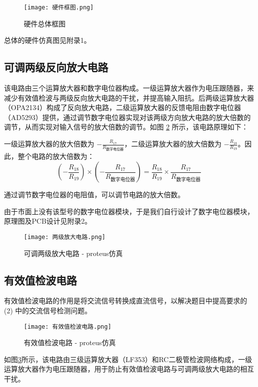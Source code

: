 \documentclass[lang=cn,11pt,a4paper]{elegantpaper}
\begin{document}
\begin{figure}[!htb]
  \centering
  \texttt{[image: 硬件框图.png]}
  \caption{硬件总体框图}
  \label{fig:hardware_picture}
\end{figure}
总体的硬件仿真图见附录1。

\subsection{可调两级反向放大电路}
该电路由三个运算放大器和数字电位器构成。一级运算放大器作为电压跟随器，来减少有效值检波与两级反向放大电路的干扰，并提高输入阻抗。后两级运算放大器（OPA2134）构成了反向放大电路，二级运算放大器的反馈电阻由数字电位器（AD5293）提供，通过调节数字电位器实现对该两级方向放大电路的放大倍数的调节，从而实现对输入信号的放大倍数的调节。如图 \ref{fig:two_stage_amplifier} 所示，该电路原理如下：

一级运算放大器的放大倍数为 \( -\frac{R_{17}}{R_{\text{数字电位器}}} \)，二级运算放大器的放大倍数为 \( -\frac{R_{18}}{R_{19}} \)。因此，整个电路的放大倍数为：
\[
  \left( -\frac{R_{18}}{R_{19}} \right) \times \left( -\frac{R_{17}}{R_{\text{数字电位器}}} \right) = \frac{R_{18}}{R_{19}} \times \frac{R_{17}}{R_{\text{数字电位器}}}
\]

通过调节数字电位器的电阻值，可以调节电路的放大倍数。

由于市面上没有该型号的数字电位器模块，于是我们自行设计了数字电位器模块，原理图及PCB设计见附录2。
\begin{figure}[!htb]
  \centering
  \texttt{[image: 两级放大电路.png]}
  \caption{可调两级放大电路 - proteus仿真}
  \label{fig:two_stage_amplifier}
\end{figure}

\subsection{有效值检波电路}
有效值检波电路的作用是将交流信号转换成直流信号，以解决题目中提高要求的 (2) 中的交流信号检测问题。

\begin{figure}[!htb]
  \centering
  \texttt{[image: 有效值检波电路.png]}
  \caption{有效值检波电路 - proteus仿真}
  \label{fig:effective_value_detection}
\end{figure}

如图\ref{fig:effective_value_detection}所示，该电路由三级运算放大器（LF353）和RC二极管检波网络构成，一级运算放大器作为电压跟随器，用于防止有效值检波电路与可调两级放大电路的相互干扰。
\end{document}
